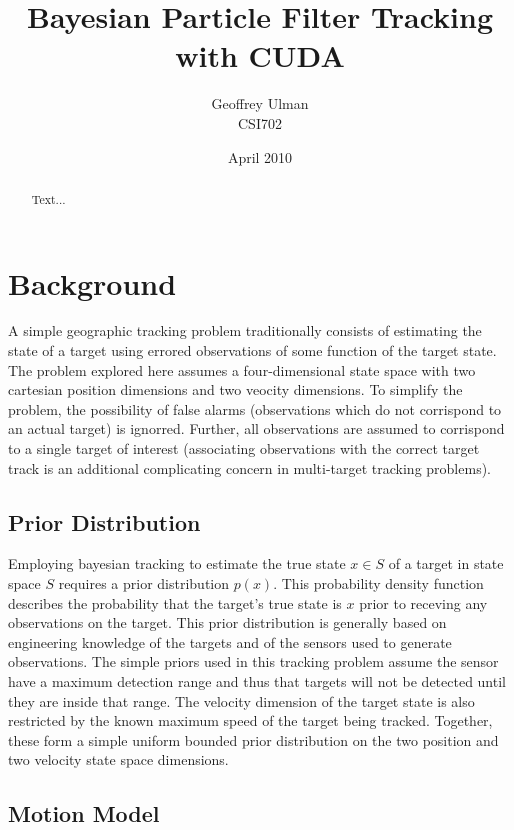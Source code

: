 \documentclass{article}
\begin{document}
\title{Bayesian Particle Filter Tracking with CUDA}
\author{Geoffrey Ulman\\
        CSI702}
\date{April 2010}
\maketitle

\begin{abstract}
Text...
\end{abstract}

\tableofcontents

\section{Background}
A simple geographic tracking problem traditionally consists of estimating the state of a target using errored observations of some function of the target state. The problem explored here assumes a four-dimensional state space with two cartesian position dimensions and two veocity dimensions. To simplify the problem, the possibility of false alarms (observations which do not corrispond to an actual target) is ignorred. Further, all observations are assumed to corrispond to a single target of interest (associating observations with the correct target track is an additional complicating concern in multi-target tracking problems).

\subsection{Prior Distribution}
Employing bayesian tracking to estimate the true state \(x \in S\) of a target in state space \(S\) requires a prior distribution \(p(x)\). This probability density function describes the probability that the target's true state is \(x\) prior to receving any observations on the target. This prior distribution is generally based on engineering knowledge of the targets and of the sensors used to generate observations. The simple priors used in this tracking problem assume the sensor have a maximum detection range and thus that targets will not be detected until they are inside that range. The velocity dimension of the target state is also restricted by the known maximum speed of the target being tracked. Together, these form a simple uniform bounded prior distribution on the two position and two velocity state space dimensions.

\subsection{Motion Model}
\end{document}

